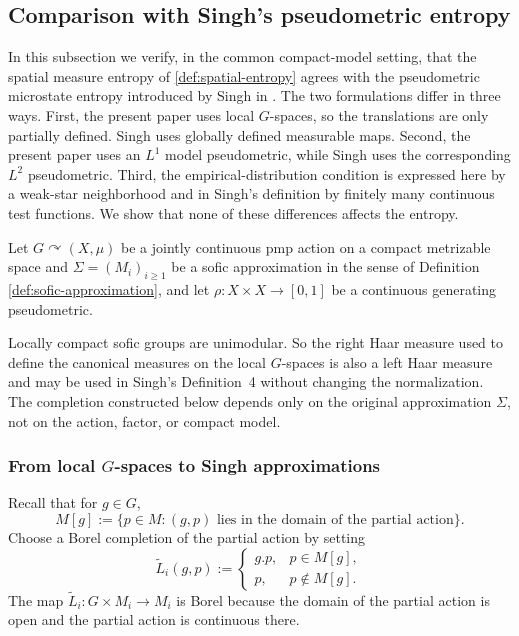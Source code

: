 \documentclass[12pt]{amsart}
\theoremstyle{definition}
\newcommand{\1}{\mathbf 1}
\begin{document}
\subsection{Comparison with Singh’s pseudometric entropy}
In this subsection we verify, in the common compact-model setting, that the
spatial measure entropy of \cref{def:spatial-entropy} agrees with the
pseudometric microstate entropy introduced by Singh in
\cite[Definitions~9--11]{SinghThesis}. The two formulations differ in three ways. First, the present paper uses local $G$-spaces, so the translations are only
partially defined. Singh uses globally defined measurable maps. Second, the
present paper uses an $L^1$ model pseudometric, while Singh
uses the corresponding $L^2$ pseudometric. Third, the empirical-distribution
condition is expressed here by a weak-star neighborhood and in Singh's definition
by finitely many continuous test functions. We show that none of these differences affects the entropy.

Let $G\curvearrowright (X,\mu)$ be a jointly continuous
pmp action on a compact metrizable space  and $\Sigma=(M_i)_{i\geq 1}$ be a sofic approximation
in the sense of Definition \ref{def:sofic-approximation}, and let
$\rho:X\times X\to[0,1]$ be a continuous generating pseudometric.

	Locally compact sofic groups are unimodular. So the right Haar measure
used to define the canonical measures on the local $G$-spaces is also a left
Haar measure and may be used in Singh's Definition~4 without changing the
normalization. The completion constructed below depends only on the original
approximation $\Sigma$, not on the action, factor, or compact model.

\subsubsection{From local \texorpdfstring{$G$}{G}-spaces to Singh approximations}

Recall that for $g\in G$,
\[
M[g]:=\{p\in M:(g,p)\text{ lies in the domain of the partial action}\}.
\]
Choose a Borel completion of the partial action by setting
\begin{equation}\label{eq:completion}
	\widetilde L_i(g,p):=
	\begin{cases}
		g.p, & p\in M[g],\\
		p,   & p\notin M[g].
	\end{cases}
\end{equation}
The map $\widetilde L_i:G\times M_i\to M_i$ is Borel because the domain of the
partial action is open and the partial action is continuous there.
\end{document}
